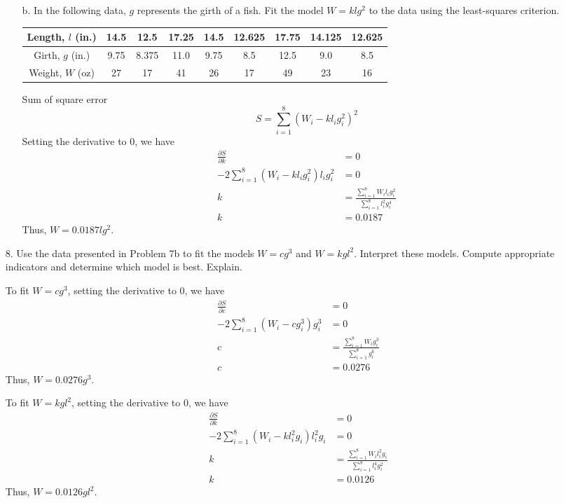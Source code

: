 \documentclass[10pt]{report}
\begin{document}
\begin{enumerate}
\begin{enumerate}
		\item [b.]
		In the following data, $g$ represents the girth of a fish. Fit the model $W=klg^2$ to the data using the least-squares criterion.
		\begin{table}[H]
			\centering
			\begin{tabular}{*{9}{c}} 
				\toprule
				Length, $l$ (in.) & 14.5 & 12.5 & 17.25 & 14.5 & 12.625 & 17.75 & 14.125 & 12.625 \\ \midrule
				Girth, $g$ (in.) & 9.75 & 8.375 & 11.0 & 9.75 & 8.5 & 12.5 & 9.0 & 8.5  \\ \midrule
				Weight, $W$ (oz) & 27 & 17 & 41 & 26 & 17 & 49 & 23 & 16  \\
				\bottomrule
			\end{tabular}
		\end{table}
		Sum of square error
		\[
		S = \sum_{i=1}^{8} (W_i - k l_i g_i^2)^2
		\]
		Setting the derivative to 0, we have
		\begin{align*}
			\frac{\partial S}{\partial k} &= 0\\
			-2 \sum_{i=1}^{8} (W_i - k l_i g_i^2) l_i g_i^2 &= 0\\
			k &= \frac{\sum_{i=1}^{8} W_i l_i g_i^2}{\sum_{i=1}^{8} l_i^2 g_i^4}\\
			k &= 0.0187
		\end{align*}
		Thus, $W=0.0187lg^2$.
	\end{enumerate}
	
	\item [8.]
	Use the data presented in Problem 7b to fit the models $W=cg^3$ and $W=kgl^2$. Interpret these models. Compute appropriate indicators and determine which model is best. Explain.
	
	To fit $W=cg^3$, setting the derivative to 0, we have
	\begin{align*}
		\frac{\partial S}{\partial c} &= 0\\
		-2 \sum_{i=1}^{8} (W_i - c g_i^3) g_i^3 &= 0\\
		c &= \frac{\sum_{i=1}^{8} W_i g_i^3}{\sum_{i=1}^{8} g_i^6}\\
		c &= 0.0276
	\end{align*}
	Thus, $W=0.0276g^3$.
	
	To fit $W=kgl^2$, setting the derivative to 0, we have
	\begin{align*}
		\frac{\partial S}{\partial k} &= 0\\
		-2 \sum_{i=1}^{8} (W_i - k l_i^2 g_i) l_i^2 g_i &= 0\\
		k &= \frac{\sum_{i=1}^{8} W_i l_i^2 g_i}{\sum_{i=1}^{8} l_i^4 g_i^2}\\
		k &= 0.0126
	\end{align*}
	Thus, $W=0.0126gl^2$.
	

\end{enumerate}
\end{document}
